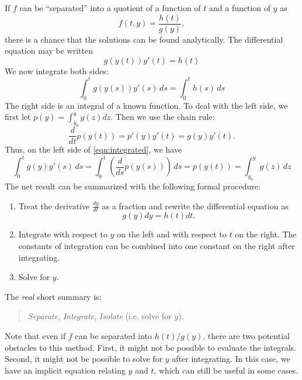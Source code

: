 \documentclass[reqno]{immbook}
\begin{document}
\medskip
If $f$ can be ``separated'' into a quotient of a function of $t$ and a function
of $y$ as
\begin{equation}
   f(t,y) = \frac{h(t)}{g(y)},
\end{equation}
there is a chance that the solutions can
be found analytically.
The differential equation may be written
\begin{equation}
  g(y(t))y'(t) = h(t)
\label{eqn:separated}
\end{equation}
We now integrate both sides:
\begin{equation}
    \int_0^t g(y(s))y'(s) \, ds = \int_0^t h(s) \, ds
\label{eqn:integrated}
\end{equation}
The right side is an integral of a known function.
To deal with the left side, we first let $p(y) = \int_{y_0}^y g(z) dz$.
Then  we use the chain rule:
\begin{equation}
   \frac{d}{dt} p(y(t)) = p'(y)y'(t) = g(y)y'(t).
\end{equation}
Thus, on the left side of \eqref{eqn:integrated}, we have
\begin{equation}
  \int_0^t g(y)y'(s)\,ds = \int_0^t \left(\frac{d}{ds} p(y(s))\right)\, ds = p(y(t)) = 
    \int_{y_0}^y g(z) \, dz
\end{equation}
The net result can be summarized with the following formal procedure:
\begin{enumerate}
\item Treat the derivative $\frac{dy}{dt}$ as a fraction and rewrite the differential equation
as
\begin{equation}
   g(y)dy = h(t)dt.
\end{equation}
\item Integrate with respect to $y$ on the left and with respect to $t$ on the right.
The constants of integration can be combined into one constant on the right after
integrating.
\item Solve for $y$.
\end{enumerate}
The \emph{real} short summary is:
\begin{quote}
  \emph{Separate}, \emph{Integrate}, \emph{Isolate} (i.e. solve for $y$).
\end{quote}
Note that even if $f$ can be separated into $h(t)/g(y)$, there are two potential obstacles
to this method. First, it might not be possible to evaluate the integrals.
Second, it might not be possible to solve for $y$ after integrating.
In this case, we have an implicit equation relating $y$ and $t$, which can still
be useful in some cases.
\end{document}
